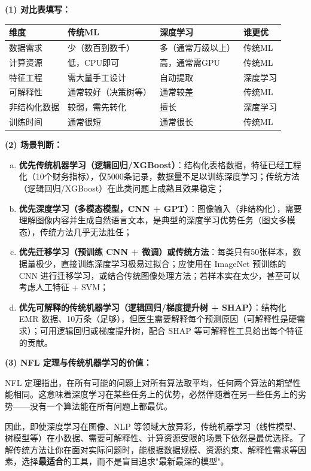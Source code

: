 \documentclass[a4paper,11pt]{ctexart}
\begin{document}
\begin{solutionbox}[参考答案与详细解析]
    \textbf{(1) 对比表填写：}

    \begin{center}
    \begin{tabular}{p{3.0cm} p{3.2cm} p{3.2cm} p{1.8cm}}
        \toprule
        维度 & 传统ML & 深度学习 & 谁更优 \\
        \midrule
        数据需求 & 少（数百到数千） & 多（通常万级以上） & 传统ML \\[0.8em]
        计算资源 & 低，CPU即可 & 高，通常需GPU & 传统ML \\[0.8em]
        特征工程 & 需大量手工设计 & 自动提取 & 深度学习 \\[0.8em]
        可解释性 & 通常较好（决策树等） & 通常较差 & 传统ML \\[0.8em]
        非结构化数据 & 较弱，需先转化 & 擅长 & 深度学习 \\[0.8em]
        训练时间 & 通常很短 & 通常很长 & 传统ML \\
        \bottomrule
    \end{tabular}
    \end{center}

    \textbf{(2) 场景判断：}

    \begin{enumerate}[a.]
        \item \textbf{优先传统机器学习（逻辑回归/XGBoost）}：结构化表格数据，特征已经工程化（10个财务指标），仅5000条记录，数据量不足以训练深度学习；传统方法（逻辑回归/XGBoost）在此类问题上成熟且效果稳定；
        \item \textbf{优先深度学习（多模态模型，CNN + GPT）}：图像输入（非结构化），需要理解图像内容并生成自然语言文本，是典型的深度学习优势任务（图文多模态），传统方法几乎无法胜任；
        \item \textbf{优先迁移学习（预训练 CNN + 微调）或传统方法}：每类只有50张样本，数据量极少，直接训练深度学习极易过拟合；应使用在 ImageNet 预训练的 CNN 进行迁移学习，或结合传统图像处理方法；若样本实在太少，甚至可以考虑人工特征 + SVM；
        \item \textbf{优先可解释的传统机器学习（逻辑回归/梯度提升树 + SHAP）}：结构化 EMR 数据、10万条（足够），但医生需要解释每个预测原因（可解释性是硬需求）；可用逻辑回归或梯度提升树，配合 SHAP 等可解释性工具给出每个特征的贡献。
    \end{enumerate}

    \textbf{(3) NFL 定理与传统机器学习的价值：}

    NFL 定理指出，在所有可能的问题上对所有算法取平均，任何两个算法的期望性能相同。这意味着深度学习在某些任务上的优势，必然伴随着在另一些任务上的劣势——没有一个算法能在所有问题上都最优。

    因此，即使深度学习在图像、NLP 等领域大放异彩，传统机器学习（线性模型、树模型等）在小数据、需要可解释性、计算资源受限的场景下依然是最优选择。了解传统方法让你在面对实际问题时，能根据数据规模、资源约束、解释性需求等因素，选择\textbf{最适合}的工具，而不是盲目追求"最新最深的模型"。
\end{solutionbox}
\end{document}
